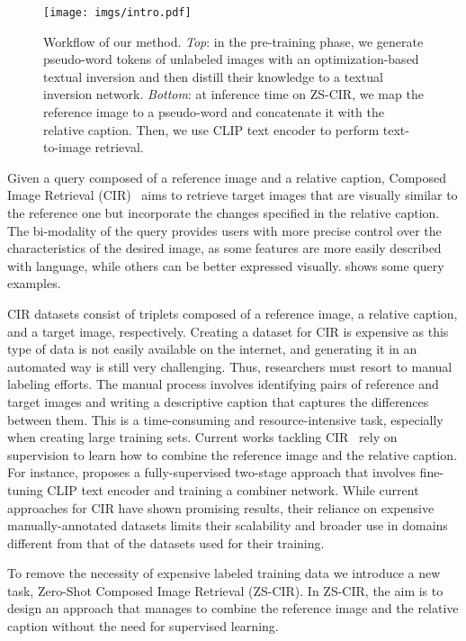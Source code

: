 \documentclass[10pt,twocolumn,letterpaper]{article}
\begin{document}
\begin{figure}
    \centering
    \texttt{[image: imgs/intro.pdf]}
    \caption{Workflow of our method. \textit{Top}: in the pre-training phase, we generate pseudo-word tokens of unlabeled images with an optimization-based textual inversion and then distill their knowledge to a textual inversion network. \textit{Bottom}: at inference time on ZS-CIR, we map the reference image to a pseudo-word  and concatenate it with the relative caption. Then, we use CLIP text encoder to perform text-to-image retrieval.}
    \label{fig:intro}
\end{figure}

 Given a query composed of a reference image and a relative caption, Composed Image Retrieval (CIR)~\cite{vo2019composing, liu2021image} aims to retrieve target images that are visually similar to the reference one but incorporate the changes specified in the relative caption. The bi-modality of the query provides users with more precise control over the characteristics of the desired image, as some features are more easily described with language, while others can be better expressed visually.  shows some query examples.

CIR datasets consist of triplets  composed of a reference image, a relative caption, and a target image, respectively. Creating a dataset for CIR is expensive as this type of data is not easily available on the internet, and generating it in an automated way is still very challenging. Thus, researchers must resort to manual labeling efforts. The manual process involves identifying pairs of reference and target images and writing a descriptive caption that captures the differences between them. This is a time-consuming and resource-intensive task, especially when creating large training sets. Current works tackling CIR~\cite{baldrati2022conditioned, baldrati2022effective, delmasartemis, liu2021image, lee2021cosmo} rely on supervision to learn how to combine the reference image and the relative caption. For instance, \cite{baldrati2022conditioned} proposes a fully-supervised two-stage approach that involves fine-tuning CLIP text encoder and training a combiner network. While current approaches for CIR have shown promising results, their reliance on expensive manually-annotated datasets limits their scalability and broader use in domains different from that of the datasets used for their training.

To remove the necessity of expensive labeled training data we introduce a new task, Zero-Shot Composed Image Retrieval (ZS-CIR). In ZS-CIR, the aim is to design an approach that manages to combine the reference image and the relative caption without the need for supervised learning. 
\end{document}
